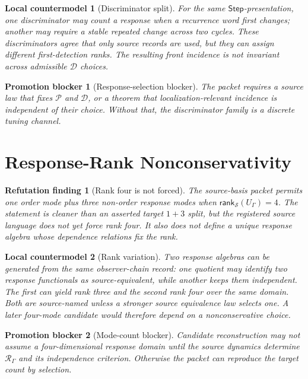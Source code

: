 \documentclass[11pt]{article}
\newcommand{\Step}{\mathsf{Step}}
\newcommand{\RespAlg}{\mathcal{R}_{\Gamma}}
\newcommand{\Rank}{\mathsf{rank}_{\mathcal{S}}}
\newtheorem{refutationfinding}{Refutation finding}
\newtheorem{countermodel}{Local countermodel}
\newtheorem{blocker}{Promotion blocker}
\begin{document}
\begin{countermodel}[Discriminator split]
For the same \(\Step\)-presentation, one discriminator may count a response
when a recurrence word first changes; another may require a stable repeated
change across two cycles. These discriminators agree that only source records
are used, but they can assign different first-detection ranks. The resulting
front incidence is not invariant across admissible \(\mathcal{D}\) choices.
\end{countermodel}

\begin{blocker}[Response-selection blocker]
The packet requires a source law that fixes \(\mathcal{P}\) and
\(\mathcal{D}\), or a theorem that localization-relevant incidence is
independent of their choice. Without that, the discriminator family is a
discrete tuning channel.
\end{blocker}

\section{Response-Rank Nonconservativity}

\begin{refutationfinding}[Rank four is not forced]
The source-basis packet permits one order mode plus three non-order response
modes when \(\Rank(U_{\Gamma})=4\). The statement is cleaner than an asserted
target \(1+3\) split, but the registered source language does not yet force
rank four. It also does not define a unique response algebra whose dependence
relations fix the rank.
\end{refutationfinding}

\begin{countermodel}[Rank variation]
Two response algebras can be generated from the same observer-chain record:
one quotient may identify two response functionals as source-equivalent,
while another keeps them independent. The first can yield rank three and the
second rank four over the same domain. Both are source-named unless a
stronger source equivalence law selects one. A later four-mode candidate would
therefore depend on a nonconservative choice.
\end{countermodel}

\begin{blocker}[Mode-count blocker]
Candidate reconstruction may not assume a four-dimensional response domain
until the source dynamics determine \(\RespAlg\) and its independence
criterion. Otherwise the packet can reproduce the target count by selection.
\end{blocker}
\end{document}
